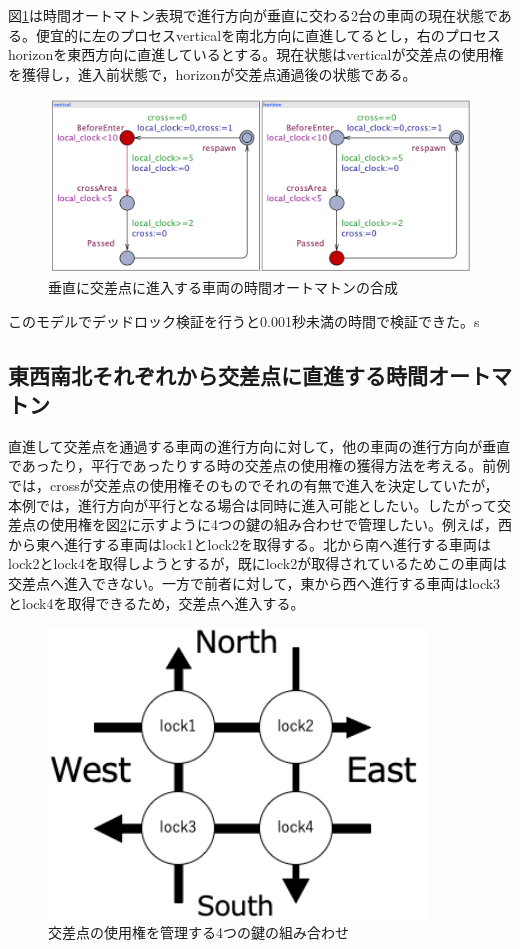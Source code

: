 \documentclass{tpu-sotu}
\begin{document}
	図\ref{PerpendicularS}は時間オートマトン表現で進行方向が垂直に交わる2台の車両の現在状態である。便宜的に左のプロセスverticalを南北方向に直進してるとし，右のプロセスhorizonを東西方向に直進しているとする。現在状態はverticalが交差点の使用権を獲得し，進入前状態で，horizonが交差点通過後の状態である。
	\begin{figure}[htbp]
	\centering
	\includegraphics[width=130mm]{PerpendicularSimu.png}
	\caption{垂直に交差点に進入する車両の時間オートマトンの合成}
	\label{PerpendicularS}
	\end{figure}
	
	このモデルでデッドロック検証を行うと0.001秒未満の時間で検証できた。s

	
	\subsection{東西南北それぞれから交差点に直進する時間オートマトン}
	直進して交差点を通過する車両の進行方向に対して，他の車両の進行方向が垂直であったり，平行であったりする時の交差点の使用権の獲得方法を考える。前例では，crossが交差点の使用権そのものでそれの有無で進入を決定していたが，本例では，進行方向が平行となる場合は同時に進入可能としたい。したがって交差点の使用権を図\ref{oTWoL}に示すように4つの鍵の組み合わせで管理したい。例えば，西から東へ進行する車両はlock1とlock2を取得する。北から南へ進行する車両はlock2とlock4を取得しようとするが，既にlock2が取得されているためこの車両は交差点へ進入できない。一方で前者に対して，東から西へ進行する車両はlock3とlock4を取得できるため，交差点へ進入する。
	\begin{figure}[htbp]
	\centering
	\includegraphics[width=100mm]{onTheWayofLock.png}
	\caption{交差点の使用権を管理する4つの鍵の組み合わせ}
	\label{oTWoL}
	\end{figure}
	
\end{document}
